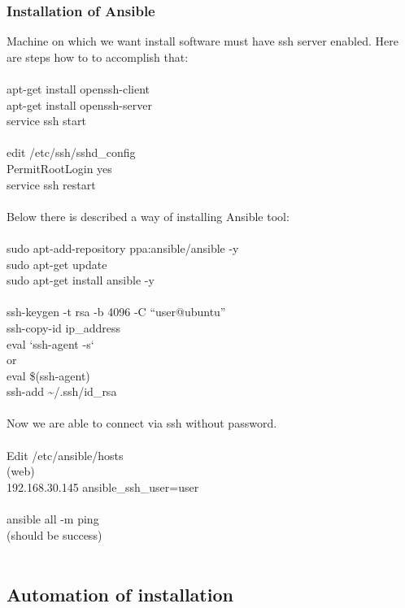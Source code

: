 \documentclass[12pt, a4paper]{article}
\begin{document}
\subsubsection{Installation of Ansible}
Machine on which we want install software must have ssh server enabled. Here are steps how to to accomplish that:\\
\\
apt-get install openssh-client\\
apt-get install openssh-server\\
service ssh start\\
\\
edit /etc/ssh/sshd\_config\\
PermitRootLogin yes\\
service ssh restart\\
\\
Below there is described a way of installing Ansible tool:\\
\\
sudo apt-add-repository ppa:ansible/ansible -y\\
sudo apt-get update\\
sudo apt-get install ansible -y\\
\\
ssh-keygen -t rsa -b 4096 -C “user@ubuntu”\\
ssh-copy-id ip\_address\\
eval `ssh-agent -s`\\
or\\
eval \$(ssh-agent)\\
ssh-add \~{}/.ssh/id\_rsa\\
\\
Now we are able to connect via ssh without password.\\
\\
Edit /etc/ansible/hosts\\
(web)\\
192.168.30.145 ansible\_ssh\_user=user\\
\\
ansible all -m ping\\
(should be success)\\
\\




\subsection{Automation of installation}
\end{document}
